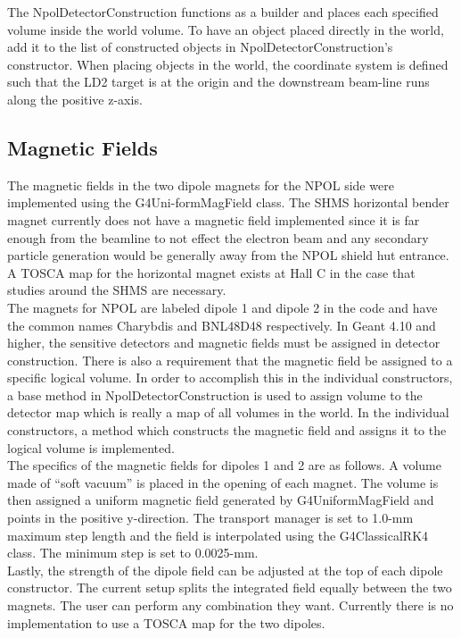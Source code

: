 \documentclass[10pt,titlepage]{article}
\begin{document}
The NpolDetectorConstruction functions as a builder and places each specified volume inside the world volume.  To have an object placed directly in the world, add it to the list of constructed objects in NpolDetectorConstruction's constructor.  When placing objects in the world, the coordinate system is defined such that the LD2 target is at the origin and the downstream beam-line runs along the positive z-axis.

\subsection{Magnetic Fields}

The magnetic fields in the two dipole magnets for the NPOL side were implemented using the G4Uni-formMagField class.  The SHMS horizontal bender magnet currently does not have a magnetic field implemented since it is far enough from the beamline to not effect the electron beam and any secondary particle generation would be generally away from the NPOL shield hut entrance. A TOSCA map for the horizontal magnet exists at Hall C in the case that studies around the SHMS are necessary. \\

The magnets for NPOL are labeled dipole 1 and dipole 2 in the code and have the common names Charybdis and BNL48D48 respectively. In Geant 4.10 and higher, the sensitive detectors and magnetic fields must be assigned in detector construction.  There is also a requirement that the magnetic field be assigned to a specific logical volume.  In order to accomplish this in the individual constructors, a base method in NpolDetectorConstruction is used to assign volume to the detector map which is really a map of all volumes in the world. In the individual constructors, a method which constructs the magnetic field and assigns it to the logical volume is implemented. \\

The specifics of the magnetic fields for dipoles 1 and 2 are as follows. A volume made of ``soft vacuum'' is placed in the opening of each magnet. The volume is then assigned a uniform magnetic field generated by G4UniformMagField and points in the positive y-direction.  The transport manager is set to 1.0-mm maximum step length and the field is interpolated using the G4ClassicalRK4 class.  The minimum step is set to 0.0025-mm. \\

Lastly, the strength of the dipole field can be adjusted at the top of each dipole constructor.  The current setup splits the integrated field equally between the two magnets. The user can perform any combination they want.  Currently there is no implementation to use a TOSCA map for the two dipoles. \\
\end{document}
